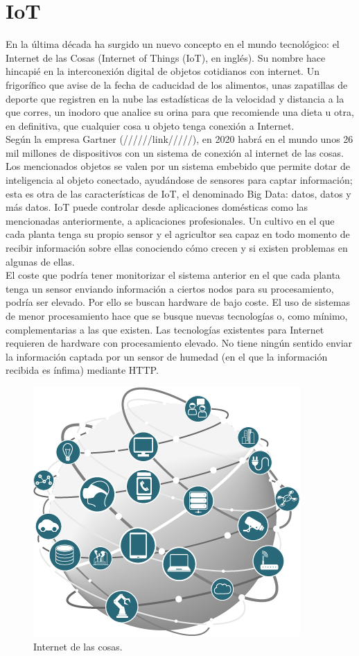 \documentclass[12pt, twoside]{book}
\begin{document}
\chapter{IoT}
En la última década ha surgido un nuevo concepto en el mundo tecnológico: el Internet de las Cosas (Internet of Things (IoT), en inglés). Su nombre hace hincapié en la interconexión digital de objetos cotidianos con internet. Un frigorífico que avise de la fecha de caducidad de los alimentos, unas zapatillas de deporte que registren en la nube las estadísticas de la velocidad y distancia a la que corres, un inodoro que analice su orina para que recomiende una dieta u otra, en definitiva, que cualquier cosa u objeto tenga conexión a Internet. \\
Según la empresa Gartner (//////link/////), en 2020 habrá en el mundo unos 26 mil millones de dispositivos con un sistema de conexión al internet de las cosas. Los mencionados objetos se valen por un sistema embebido que permite dotar de inteligencia al objeto conectado, ayudándose de sensores para captar información; esta es otra de las características de IoT, el denominado Big Data: datos, datos y más datos.
IoT puede controlar desde aplicaciones domésticas como las mencionadas anteriormente, a aplicaciones profesionales. Un cultivo en el que cada planta tenga su propio sensor y el agricultor sea capaz en todo momento de recibir información sobre ellas conociendo cómo crecen y si existen problemas en algunas de ellas. \\
El coste que podría tener monitorizar el sistema anterior en el que cada planta tenga un sensor enviando información a ciertos nodos para su procesamiento, podría ser elevado. Por ello se buscan hardware de bajo coste. El uso de sistemas de menor procesamiento hace que se busque nuevas tecnologías o, como mínimo, complementarias a las que existen. Las tecnologías existentes para Internet requieren de hardware con procesamiento elevado. No tiene ningún sentido enviar la información captada por un sensor de humedad (en el que la información recibida es ínfima) mediante HTTP.\\
\begin{figure}[H]
\centering
\includegraphics[scale=0.4]{images/iot}
\caption{Internet de las cosas.}\label{L105}
\end{figure}
\end{document}
